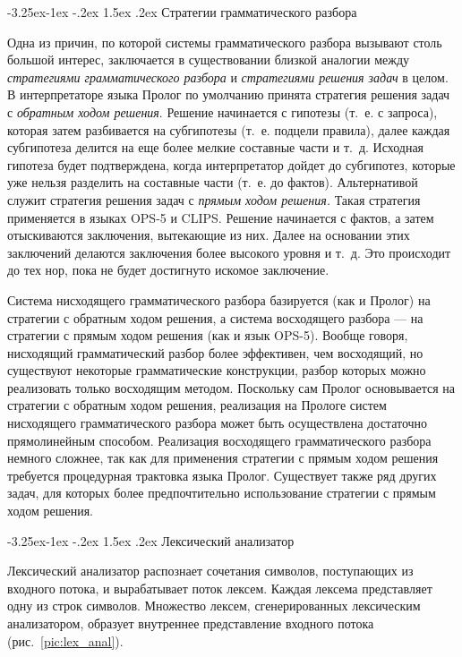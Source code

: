 \documentclass[12pt, openany, twoside]{book} %
\makeatletter
\renewcommand\subsection{\@startsection{subsection}{2}{\z@}%
                                     {-3.25ex\@plus -1ex \@minus -.2ex}%
                                     {1.5ex \@plus .2ex}%
                                     {\normalfont\normalsize\bfseries}}
\makeatother
\begin{document}
\subsection{Стратегии грамматического разбора}

Одна из причин, по которой системы грамматического разбора вызывают столь большой интерес, заключается в существовании близкой аналогии между \emph{стратегиями грамматического разбора} и \emph{стратегиями решения задач} в целом. В интерпретаторе языка Пролог по умолчанию принята стратегия решения задач с \emph{обратным ходом решения}. Решение начинается с гипотезы (т.~е. с запроса), которая затем разбивается на субгипотезы (т.~е. подцели правила), далее каждая субгипотеза делится на еще более мелкие составные части и т.~д. Исходная гипотеза будет подтверждена, когда интерпретатор дойдет до субгипотез, которые уже нельзя разделить на составные части (т.~е. до фактов). Альтернативой служит стратегия решения задач с \emph{прямым ходом решения.} Такая стратегия применяется в языках OPS-5 и CLIPS. Решение начинается с фактов, а затем отыскиваются заключения, вытекающие из них. Далее на основании этих заключений делаются заключения более высокого уровня и т.~д. Это происходит до тех нор, пока не будет достигнуто искомое заключение.

Система нисходящего грамматического разбора базируется (как и Пролог) на стратегии с обратным ходом решения, а система восходящего разбора --- на стратегии с прямым ходом решения (как и язык OPS-5). Вообще говоря, нисходящий грамматический разбор более эффективен, чем восходящий, но существуют некоторые грамматические конструкции, разбор которых можно реализовать только восходящим методом. Поскольку сам Пролог основывается на стратегии с обратным ходом решения, реализация на Прологе систем нисходящего грамматического разбора может быть осуществлена достаточно прямолинейным способом. Реализация восходящего грамматического разбора немного сложнее, так как для применения стратегии с прямым ходом решения требуется процедурная трактовка языка Пролог. Существует также ряд других задач, для которых более предпочтительно использование стратегии с прямым ходом решения.

\subsection{Лексический анализатор}

Лексический анализатор распознает сочетания символов, поступающих из входного потока, и вырабатывает поток лексем. Каждая лексема представляет одну из строк символов. Множество лексем, сгенерированных лексическим анализатором, образует внутреннее представление входного потока (рис.~\ref{pic:lex_anal}).
\end{document}
